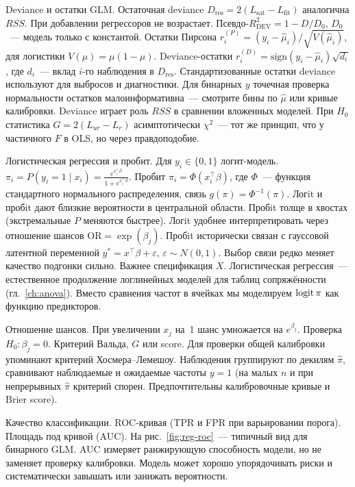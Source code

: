 Deviance и остатки GLM. Остаточная deviance $D_{\mathrm{res}}=2(L_{\mathrm{sat}}-L_{\mathrm{fit}})$ аналогична $RSS$. При добавлении регрессоров не возрастает. Псевдо-$R^2_{\mathrm{DEV}}=1-D/D_0$, $D_0$~--- модель только с константой.
Остатки Пирсона $r_i^{(P)}=(y_i-\hat\mu_i)/\sqrt{V(\hat\mu_i)}$, для логистики $V(\mu)=\mu(1-\mu)$.
Deviance-остатки $r_i^{(D)}=\mathrm{sign}(y_i-\hat\mu_i)\sqrt{d_i}$, где $d_i$~--- вклад $i$-го наблюдения в $D_{\mathrm{res}}$.
Стандартизованные остатки deviance используют для выбросов и диагностики. Для бинарных $y$ точечная проверка нормальности остатков малоинформативна~--- смотрите бины по $\hat\mu$ или кривые калибровки.
Deviance играет роль $RSS$ в сравнении вложенных моделей. При $H_0$ статистика $G=2(L_{ur}-L_r)$ асимптотически $\chi^2$~--- тот же принцип, что у частичного $F$ в OLS, но через правдоподобие.

Логистическая регрессия и пробит. Для $y_i\in\{0,1\}$ логит-модель. $\pi_i=P(y_i=1\mid x_i)=\frac{e^{x_i^\top\beta}}{1+e^{x_i^\top\beta}}$.
Пробит $\pi_i=\Phi(x_i^\top\beta)$, где $\Phi$~--- функция стандартного нормального распределения, связь $g(\pi)=\Phi^{-1}(\pi)$.
Логit и пробit дают близкие вероятности в центральной области. Пробit толще в хвостах (экстремальные $P$ меняются быстрее).
Логit удобнее интерпретировать через отношение шансов $\mathrm{OR}=\exp(\beta_j)$. Пробit исторически связан с гауссовой латентной переменной $y^*=x^\top\beta+\varepsilon$, $\varepsilon\sim N(0,1)$.
Выбор связи редко меняет качество подгонки сильно. Важнее спецификация $X$.
Логистическая регрессия~--- естественное продолжение логлинейных моделей для таблиц сопряжённости (гл.~\ref{ch:anova}). Вместо сравнения частот в ячейках мы моделируем $\operatorname{logit}\pi$ как функцию предикторов.

Отношение шансов. При увеличении $x_j$ на~1 шанс умножается на $e^{\beta_j}$.
Проверка $H_0\colon\beta_j=0$. Критерий Вальда, $G$ или score.
Для проверки общей калибровки упоминают критерий Хосмера--Лемешоу. Наблюдения группируют по декилям $\hat\pi$, сравнивают наблюдаемые и ожидаемые частоты $y=1$ (на малых $n$ и при непрерывных $\hat\pi$ критерий спорен. Предпочтительны калибровочные кривые и Brier score).

Качество классификации. ROC-кривая (TPR и FPR при варьировании порога). Площадь под кривой (AUC). На рис.~\ref{fig:reg-roc}~--- типичный вид для бинарного GLM.
AUC измеряет ранжирующую способность модели, но не заменяет проверку калибровки. Модель может хорошо упорядочивать риски и систематически завышать или занижать вероятности.

